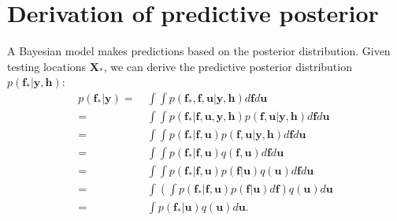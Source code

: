 \documentclass[journal]{IEEEtran}
\begin{document}
\section{Derivation of predictive posterior}
\label{append:pred-posterior}

A Bayesian model makes predictions based on the posterior distribution. Given testing locations $\mathbf{X}_*$, we can derive the predictive posterior distribution $p(\mathbf{f}_*|\mathbf{y}, \mathbf{h})$:
\begingroup
\allowdisplaybreaks
\begin{align*}
    p(\mathbf{f}_*|\mathbf{y}) 
    = &~ \int \int p(\mathbf{f}_*, \mathbf{f}, \mathbf{u}|\mathbf{y}, \mathbf{h}) d \mathbf{f} d \mathbf{u}\\
    = &~ \int \int p(\mathbf{f}_* |\mathbf{f}, \mathbf{u}, \mathbf{y}, \mathbf{h}) p(\mathbf{f}, \mathbf{u} | \mathbf{y}, \mathbf{h}) d \mathbf{f} d \mathbf{u}\\
    = &~ \int \int p(\mathbf{f}_* |\mathbf{f}, \mathbf{u}) p(\mathbf{f}, \mathbf{u} | \mathbf{y}, \mathbf{h}) d \mathbf{f} d \mathbf{u}\\
    = &~ \int \int p(\mathbf{f}_* |\mathbf{f}, \mathbf{u}) q(\mathbf{f}, \mathbf{u}) d \mathbf{f} d \mathbf{u}\\
    = &~ \int \int p(\mathbf{f}_* |\mathbf{f}, \mathbf{u}) p(\mathbf{f} | \mathbf{u}) q(\mathbf{u}) d \mathbf{f} d \mathbf{u}\\
    = &~ \int \left ( \int p(\mathbf{f}_* |\mathbf{f}, \mathbf{u}) p(\mathbf{f} | \mathbf{u}) d \mathbf{f} \right ) q(\mathbf{u}) d \mathbf{u}\\
    = &~ \int p(\mathbf{f}_* | \mathbf{u}) q(\mathbf{u}) d \mathbf{u}.
\end{align*}
\endgroup
\end{document}
